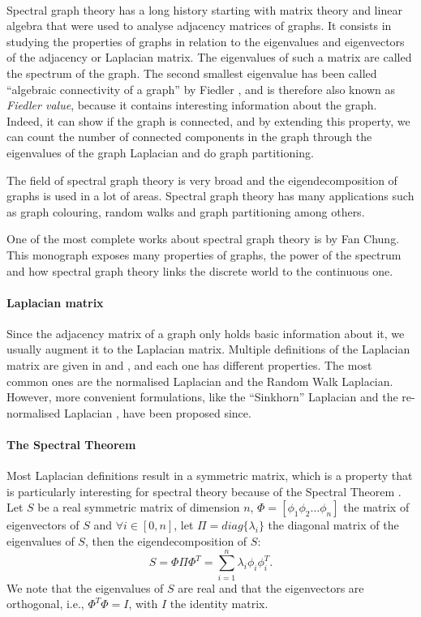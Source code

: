 \paragraph{}
Spectral graph theory has a long history starting with matrix theory and linear algebra that were used to analyse adjacency matrices of graphs.
It consists in studying the properties of graphs in relation to the eigenvalues and eigenvectors of the adjacency or Laplacian matrix.
The eigenvalues of such a matrix are called the spectrum of the graph.
The second smallest eigenvalue has been called ``algebraic connectivity of a graph'' by Fiedler \cite{fiedler_algebraic_1973}, and is therefore also known as \textit{Fiedler value}, because it contains interesting information about the graph.
Indeed, it can show if the graph is connected, and by extending this property, we can count the number of connected components in the graph through the eigenvalues of the graph Laplacian and do graph partitioning.

The field of spectral graph theory is very broad and the eigendecomposition of graphs is used in a lot of areas.
Spectral graph theory has many applications such as graph colouring, random walks and graph partitioning among others.

One of the most complete works about spectral graph theory is \cite{chung_spectral_1997} by Fan Chung.
This monograph exposes many properties of graphs, the power of the spectrum and how spectral graph theory links the discrete world to the continuous one.

\paragraph{Laplacian matrix}
Since the adjacency matrix of a graph only holds basic information about it, we usually augment it to the Laplacian matrix.
Multiple definitions of the Laplacian matrix are given in \cite{chung_spectral_1997} and \cite{siam_slides_2016}, and each one has different properties.
The most common ones are the normalised Laplacian and the Random Walk Laplacian.
However, more convenient formulations, like the ``Sinkhorn'' Laplacian \cite{milanfar_symmetrizing_2013} and the re-normalised Laplacian \cite{milanfar_new_2016}, have been proposed since.

\paragraph{The Spectral Theorem}
Most Laplacian definitions result in a symmetric matrix, which is a property that is particularly interesting for spectral theory because of the Spectral Theorem \cite{zhang_spectral_2010}.
Let \(S\) be a real symmetric matrix of dimension \(n\), \(\Phi = [\phi_1 \phi_2 \dots \phi_n ]\) the matrix of eigenvectors of \(S\) and \(\forall i \in [0,n]\), let \(\Pi = diag\{\lambda_i\}\) the diagonal matrix of the eigenvalues of \(S\), then the eigendecomposition of \(S\):
\[S = \Phi \Pi \Phi^T = \sum_{i=1}^n \lambda_i \phi_i \phi_i^T.\]
We note that the eigenvalues of \(S\) are real and that the eigenvectors are orthogonal, i.e., \(\Phi^T\Phi = I\), with \(I\) the identity matrix.

